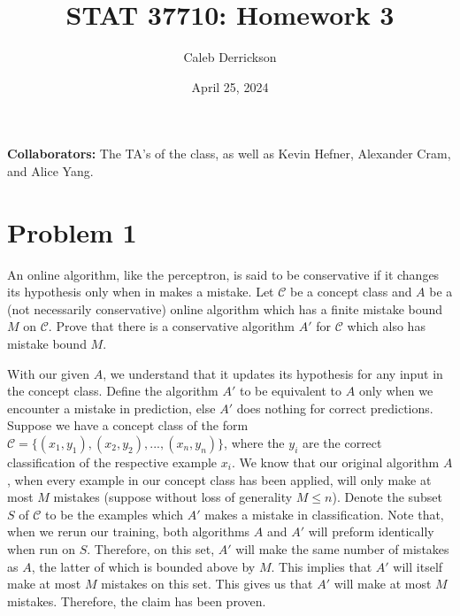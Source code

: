 

\title{STAT 37710: Homework 3}
\author{Caleb Derrickson}
\date{April 25, 2024}


\onehalfspacing
\maketitle
\allowdisplaybreaks
{\color{cit}\vspace{2mm}\noindent\textbf{Collaborators:}} The TA's of the class, as well as Kevin Hefner, Alexander Cram, and Alice Yang.

\tableofcontents
\newcommand{\scC}{\mathcal{C}}
\newcommand{\scX}{\mathcal{X}}
\newcommand{\bx}{\textbf{x}}
\renewcommand{\braket}[2]{\langle #1, #2 \rangle}
\newcommand{\sgn}{\text{sgn}}
\newcommand{\scE}{\mathcal{E}}


\newpage
\section{Problem 1}
An online algorithm, like the perceptron, is said to be conservative if it changes its hypothesis only when in makes a mistake. Let $\scC$ be a concept class and $A$ be a (not necessarily conservative) online algorithm which has a finite mistake bound $M$ on $\scC$. Prove that there is a conservative algorithm $A'$ for $\scC$ which also has mistake bound $M$.
\partbreak
\begin{solution}

    With our given $A$, we understand that it updates its hypothesis for any input in the concept class. Define the algorithm $A'$ to be equivalent to $A$ only when we encounter a mistake in prediction, else $A'$ does nothing for correct predictions. Suppose we have a concept class of the form $\scC = \{(x_1, y_1), (x_2, y_2), ..., (x_n, y_n)\}$, where the $y_i$ are the correct classification of the respective example $x_i$. We know that our original algorithm $A$, when every example in our concept class has been applied, will only make at most $M$ mistakes (suppose without loss of generality $M \leq n$). Denote the subset $S$ of $\scC$ to be the examples which $A'$ makes a mistake in classification. Note that, when we rerun our training, both algorithms $A$ and $A'$ will preform identically when run on $S$. Therefore, on this set, $A'$ will make the same number of mistakes as $A$, the latter of which is bounded above by $M$. This implies that $A'$ will itself make at most $M$ mistakes on this set. This gives us that $A'$ will make at most $M$ mistakes. Therefore, the claim has been proven.
\end{solution}


